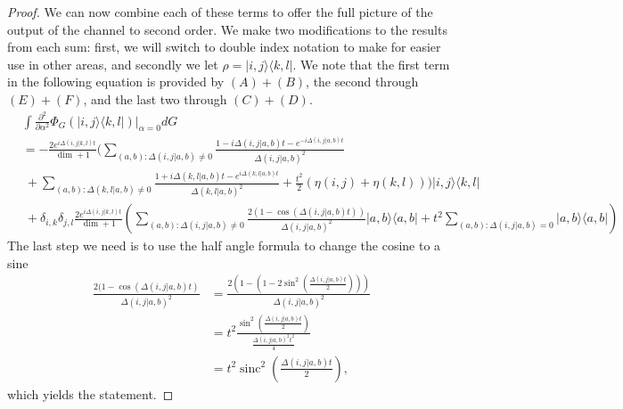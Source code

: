 \documentclass{article}
\newcommand{\ketbra}[2]{| #1\rangle\! \langle #2|}
\newcommand{\parens}[1]{\left( #1 \right)}
\DeclareMathOperator{\sinc}{sinc}
\begin{document}
\begin{proof}
 We can now combine each of these terms to offer the full picture of the output of the channel to second order. We make two modifications to the results from each sum: first, we will switch to double index notation to make for easier use in other areas, and secondly we let $\rho = \ketbra{i,j}{k,l}$. We note that the first term in the following equation is provided by $(A) + (B)$, the second through $(E) + (F)$, and the last two through $(C) + (D)$. 
 \begin{align}
     &\int \frac{\partial^2}{\partial \alpha^2} \Phi_G(\ketbra{i,j}{k,l})\bigg|_{\alpha = 0} dG \\
     &= -\frac{2  e^{i \Delta(i,j|k,l) t}}{\dim + 1} \bigg(\sum_{(a,b): \Delta(i,j|a,b) \neq 0} \frac{1 - i \Delta(i,j|a,b)t - e^{-i \Delta(i,j|a,b) t}}{\Delta(i,j|a,b)^2} \nonumber \\
     &~+ \sum_{(a,b): \Delta(k,l|a,b) \neq 0} \frac{1 + i \Delta(k,l|a,b) t - e^{i \Delta(k,l|a,b) t}}{\Delta(k,l|a,b)^2} + \frac{t^2}{2}(\eta(i,j) + \eta(k,l)) \bigg) \ketbra{i,j}{k,l} \nonumber \\
    &~ +\delta_{i,k} \delta_{j,l} \frac{2 e^{i \Delta(i,j|k,l)t}}{\dim+1} \parens{ \sum_{(a,b): \Delta(i,j|a,b) \neq 0 } \frac{2(1- \cos (\Delta(i,j|a,b)t))}{\Delta(i,j|a,b)^2} \ketbra{a,b}{a,b} + t^2 \sum_{(a,b) : \Delta(i,j|a,b) = 0} \ketbra{a,b}{a,b}} \label{eq:second_order_output}
 \end{align}
The last step we need is to use the half angle formula to change the cosine to a sine
\begin{align}
    \frac{2(1 - \cos(\Delta(i,j| a,b)t)}{\Delta(i,j|a,b)^2} &= \frac{2\left( 1 - \left(1 - 2 \sin^2\left(\frac{\Delta(i,j|a,b)t}{2} \right) \right) \right)}{\Delta(i,j|a,b)^2} \label{eq:trig_start} \\
    &= t^2 \frac{\sin^2 \left(\frac{\Delta(i,j|a,b) t}{2} \right)}{\frac{\Delta(i,j|a,b)^2 t^2}{4}} \\
    &= t^2 \sinc^2 \left(\frac{\Delta(i,j|a,b) t}{2 } \right), \label{eq:trig_end}
\end{align}
which yields the statement.



\end{proof}
\end{document}
